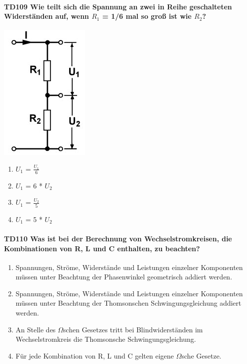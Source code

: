 \documentclass[8pt]{article}
\begin{document}
\begin{enumerate}
\begin{enumerate}[nolistsep,label=\Alph*]
\paragraph*{TD109 Wie teilt sich die Spannung an zwei in Reihe geschalteten Widerständen auf, wenn $R_{1}$ = 1/6 mal so groß ist wie $R_{2}$?}
\begin{center}
	\begin{minipage}{\linewidth}
		\centering
		\includegraphics[scale=1.0]{pics/td109_a.jpg}
	\end{minipage}
\end{center}
\begin{enumerate}[nolistsep,label=\Alph*]
\item $U_{1}$ = $\frac{U_{1}}{6}$
\item $U_{1}$ = 6 * $U_{2}$
\item $U_{1}$ = $\frac{U_{2}}{5}$
\item $U_{1}$ = 5 * $U_{2}$
\end{enumerate}

\paragraph*{TD110 Was ist bei der Berechnung von Wechselstromkreisen, die Kombinationen von R, L und C enthalten, zu beachten?}
\begin{enumerate}[nolistsep,label=\Alph*]
\item Spannungen, Ströme, Widerstände und Leistungen einzelner Komponenten müssen unter Beachtung der Phasenwinkel geometrisch addiert werden.
\item Spannungen, Ströme, Widerstände und Leistungen einzelner Komponenten müssen unter Beachtung der Thomsonschen Schwingungsgleichung addiert werden.
\item An Stelle des $\Omega$schen Gesetzes tritt bei Blindwiderständen im Wechselstromkreis die Thomsonsche Schwingungsgleichung. 
\item Für jede Kombination von R, L und C gelten eigene $\Omega$sche Gesetze.
\end{enumerate}


\end{enumerate}
\end{enumerate}
\end{document}
